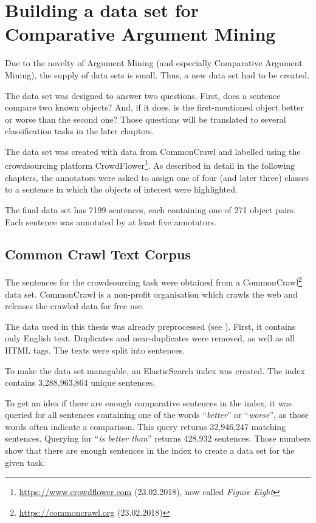\FloatBarrier
\chapter{Building a data set for Comparative Argument Mining}
\label{sec:prestudy}
Due to the novelty of Argument Mining (and especially Comparative Argument Mining), the supply of data sets is small. Thus, a new data set had to be created.

The data set was designed to answer two questions. First, does a sentence compare two known objects? And, if it does, is the first-mentioned object better or worse than the second one? Those questions will be translated to several classification tasks in the later chapters.

The data set was created with data from CommonCrawl and labelled using the crowdsourcing platform CrowdFlower\footnote{\url{https://www.crowdflower.com} (23.02.2018), now called \emph{Figure Eight}}. As described in detail in the following chapters, the annotators were asked to assign one of four (and later three) classes to a sentence in which the objects of interest were highlighted.

The final data set has 7199 sentences, each containing one of 271 object pairs. Each sentence was annotated by at least five annotators.

\section{Common Crawl Text Corpus}
The sentences for the crowdsourcing task were obtained from a CommonCrawl\footnote{\url{https://commoncrawl.org} (23.02.2018)} data set. CommonCrawl is a non-profit organisation which crawls the web and releases the crawled data for free use.

The data used in this thesis was already preprocessed (see \cite{Panchenko:2017aa}). First, it contains only English text. Duplicates and near-duplicates were removed, as well as all HTML tags. The texts were split into sentences.

To make the data set managable, an ElasticSearch index was created. The index contains 3,288,963,864 unique sentences.

To get an idea if there are enough comparative sentences in the index, it was queried for all sentences containing one of the words \enquote{\emph{better}} or \enquote{\emph{worse}},  as those words often indicate a comparison. This query returns 32,946,247 matching sentences. Querying for \enquote{\emph{is better than}} returns 428,932 sentences. Those numbers show that there are enough sentences in the index to create a data set for the given task.


